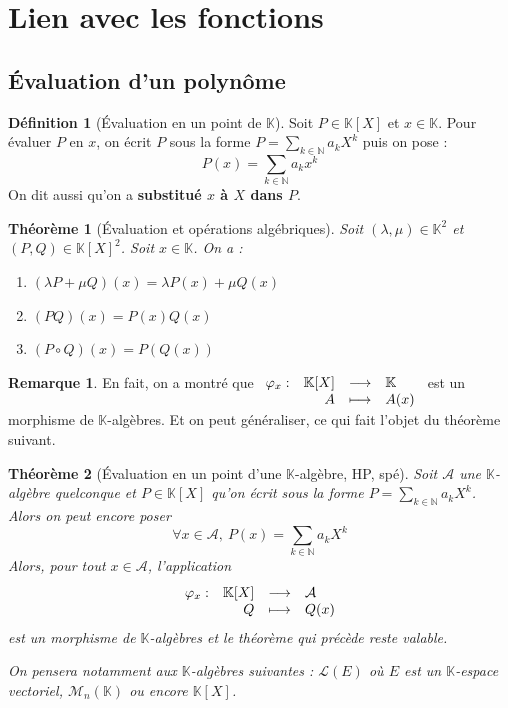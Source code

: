 \documentclass[french]{book}
\newcommand{\N}{\mathbb{N}}
\newcommand{\K}{\mathbb{K}}
\theoremstyle{plain}
\newtheorem{thm}{Théorème}[chapter]
\theoremstyle{definition}
\newtheorem{dfn}{Définition}[chapter]
\newtheorem{rmq}{Remarque}[chapter]
\theoremstyle{remark}
\begin{document}
\section{Lien avec les fonctions}
\subsection{Évaluation d'un polynôme}
\begin{dfn}[Évaluation en un point de $\K$]
	Soit $P\in\K[X]$ et $x\in\K$. Pour évaluer $P$ en $x$, on écrit $P$ sous la forme $P=\displaystyle\sum_{k\in\N}a_kX^k$ puis on pose : $$P(x)=\sum_{k\in\N} a_kx^k$$ On dit aussi qu'on a \textbf{substitué $x$ à $X$ dans $P$}.
\end{dfn}
\begin{thm}[Évaluation et opérations algébriques]
	Soit $(\lambda,\mu)\in\K^2$ et $(P,Q)\in\K[X]^2$. Soit $x\in\K$. On a :
	\begin{enumerate}
		\item $(\lambda P+\mu Q)(x)=\lambda P(x)+\mu Q(x)$
		\item $(PQ)(x)=P(x)Q(x)$
		\item $(P\circ Q)(x)=P(Q(x))$
	\end{enumerate}
\end{thm}
\begin{rmq}
	En fait, on a montré que $\begin{array}[t]{lrcl}
		\varphi_x: & \K[X] & \longrightarrow & \K \\
		& A & \longmapsto & A(x)
	\end{array}$ est un morphisme de $\K$-algèbres. Et on peut généraliser, ce qui fait l'objet du théorème suivant.
\end{rmq}
\begin{thm}[Évaluation en un point d'une $\K$-algèbre, HP, spé]
	Soit $\mathcal{A}$ une $\K$-algèbre quelconque et $P\in\K[X]$ qu'on écrit sous la forme $P=\displaystyle\sum_{k\in\N}a_kX^k$. Alors on peut encore poser $$\forall x\in\mathcal{A},\ P(x)=\sum_{k\in\N}a_kX^k$$ Alors, pour tout $x\in\mathcal{A}$, l'application $$\begin{array}[t]{lrcl}
		\varphi_x: & \K[X] & \longrightarrow & \mathcal{A} \\
		& Q & \longmapsto & Q(x)
	\end{array}$$ est un morphisme de $\K$-algèbres et le théorème qui précède reste valable. \par On pensera notamment aux $\K$-algèbres suivantes : $\mathcal{L}(E)$ où $E$ est un $\K$-espace vectoriel, $\mathcal{M}_n(\K)$ ou encore $\K[X]$.
\end{thm}
\end{document}
